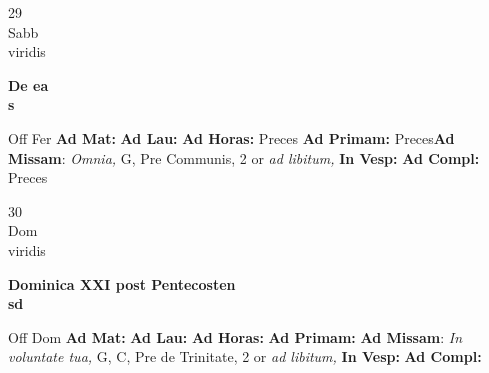 \documentclass[10pt, openany]{book}
\begin{document}
    \begin{center}
        \begin{minipage}{3.5in}
            \vspace{2em}
            \begin{minipage}{0.5in}
                {\Huge 29} \\
                {\normalsize Sabb} \\
                {\normalsize viridis}
            \end{minipage}
            \begin{minipage}{3.0in}
                \textbf{ \large De ea \\
                \textnormal{\normalsize s}} \\ 
            \end{minipage}
            \begin{justify}Off Fer
                \textbf{Ad Mat: }
                \textbf{Ad Lau: }
                \textbf{Ad Horas: }Preces
                \textbf{Ad Primam: }Preces\textbf{Ad Missam}: \textit{Omnia,} G, Pre Communis, 2 or \textit{ad libitum,}  
                \textbf{In Vesp: }
                \textbf{Ad Compl: }Preces
            \end{justify}
        \end{minipage}
    \end{center}

    \begin{center}
        \begin{minipage}{3.5in}
            \vspace{2em}
            \begin{minipage}{0.5in}
                {\Huge 30} \\
                {\normalsize Dom} \\
                {\normalsize viridis}
            \end{minipage}
            \begin{minipage}{3.0in}
                \textbf{ \large Dominica XXI post Pentecosten \\
                \textnormal{\normalsize sd}} \\ 
            \end{minipage}
            \begin{justify}Off Dom
                \textbf{Ad Mat: }
                \textbf{Ad Lau: }
                \textbf{Ad Horas: }
                \textbf{Ad Primam: }\textbf{Ad Missam}: \textit{In voluntate tua,} G, C, Pre de Trinitate, 2 or \textit{ad libitum,}  
                \textbf{In Vesp: }
                \textbf{Ad Compl: }
            \end{justify}
        \end{minipage}
    \end{center}
\end{document}
